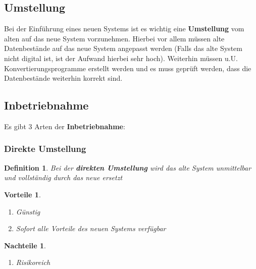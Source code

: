 \documentclass[a4paper]{article}
\theoremstyle{break}
\newtheorem{defi}{Definition}[section]
\newtheorem{why}{Vorteile}[section]
\newtheorem{whynot}{Nachteile}[section]
\begin{document}
\subsection{Umstellung}
Bei der Einführung eines neuen Systems ist es wichtig eine \textbf{Umstellung} vom alten auf das neue System vorzunehmen. Hierbei vor allem müssen alte Datenbestände auf das neue System angepasst werden (Falls das alte System nicht digital ist, ist der Aufwand hierbei sehr hoch). \newline Weiterhin müssen u.U. Konvertierungsprogramme erstellt werden und es muss geprüft werden, dass die Datenbestände weiterhin korrekt sind.
\subsection{Inbetriebnahme}
Es gibt 3 Arten der \textbf{Inbetriebnahme}:
\subsubsection{Direkte Umstellung}
	\begin{defi}
		Bei der \textbf{direkten Umstellung} wird das alte System unmittelbar und vollständig durch das neue ersetzt
	\end{defi}
	\begin{why}
		\begin{enumerate}
			\item Günstig
			\item Sofort alle Vorteile des neuen Systems verfügbar
		\end{enumerate}
	\end{why}
	\begin{whynot}
		\begin{enumerate}
			\item Risikoreich
		\end{enumerate}
	\end{whynot}
\end{document}
